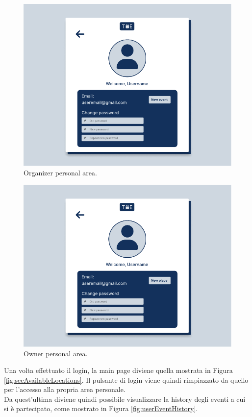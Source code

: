 \documentclass[9pt]{extarticle}
\begin{document}
\begin{figure}[!htb]
	\centering
	\includegraphics[width=.7\linewidth]{./images/OrganizerPersonalArea.pdf}
	\caption{Organizer personal area.}
	\label{fig:organizerPersonalArea}
\end{figure}
\newpage

\begin{figure}[!htb]
	\centering
	\includegraphics[width=.7\linewidth]{./images/OwnerPersonalArea.pdf}
	\caption{Owner personal area.}
	\label{fig:ownerPersonalArea}
\end{figure}

Una volta effettuato il login, la main page diviene quella mostrata in Figura \ref{fig:seeAvailableLocations}. Il pulsante di login viene quindi rimpiazzato da quello per l'accesso alla propria area personale.\\
Da quest'ultima diviene quindi possibile visualizzare la history degli eventi a cui si è partecipato, come mostrato in Figura \ref{fig:userEventHistory}.
\end{document}
